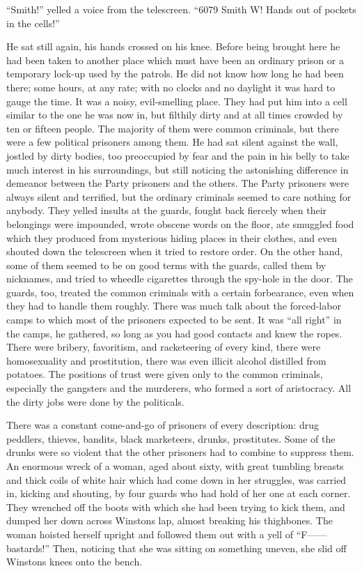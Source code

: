 ``Smith!'' yelled a voice from the telescreen. ``6079 Smith W! Hands out of
pockets in the cells!''

He sat still again, his hands crossed on his knee. Before being brought
here he had been taken to another place which must have been an ordinary
prison or a temporary lock-up used by the patrols. He did not know how
long he had been there; some hours, at any rate; with no clocks and no
daylight it was hard to gauge the time. It was a noisy, evil-smelling
place. They had put him into a cell similar to the one he was now in,
but filthily dirty and at all times crowded by ten or fifteen people.
The majority of them were common criminals, but there were a few
political prisoners among them. He had sat silent against the wall,
jostled by dirty bodies, too preoccupied by fear and the pain in his
belly to take much interest in his surroundings, but still noticing the
astonishing difference in demeanor between the Party prisoners and the
others. The Party prisoners were always silent and terrified, but the
ordinary criminals seemed to care nothing for anybody. They yelled
insults at the guards, fought back fiercely when their belongings were
impounded, wrote obscene words on the floor, ate smuggled food which
they produced from mysterious hiding places in their clothes, and even
shouted down the telescreen when it tried to restore order. On the other
hand, some of them seemed to be on good terms with the guards, called
them by nicknames, and tried to wheedle cigarettes through the spy-hole
in the door. The guards, too, treated the common criminals with a
certain forbearance, even when they had to handle them roughly. There
was much talk about the forced-labor camps to which most of the
prisoners expected to be sent. It was ``all right'' in the camps, he
gathered, so long as you had good contacts and knew the ropes. There
were bribery, favoritism, and racketeering of every kind, there were
homosexuality and prostitution, there was even illicit alcohol distilled
from potatoes. The positions of trust were given only to the common
criminals, especially the gangsters and the murderers, who formed a sort
of aristocracy. All the dirty jobs were done by the politicals.

There was a constant come-and-go of prisoners of every description: drug
peddlers, thieves, bandits, black marketeers, drunks, prostitutes. Some
of the drunks were so violent that the other prisoners had to combine to
suppress them. An enormous wreck of a woman, aged about sixty, with
great tumbling breasts and thick coils of white hair which had come down
in her struggles, was carried in, kicking and shouting, by four guards
who had hold of her one at each corner. They wrenched off the boots with
which she had been trying to kick them, and dumped her down across
Winston\textquotesingle s lap, almost breaking his thighbones. The woman
hoisted herself upright and followed them out with a yell of ``F------
bastards!'' Then, noticing that she was sitting on something uneven, she
slid off Winston\textquotesingle s knees onto the bench.

